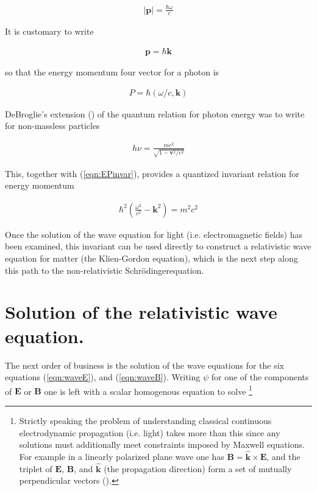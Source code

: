 \documentclass[]{eliblog}
\newcommand{\Abs}[1]{{\left\lvert{#1}\right\rvert}}
\newcommand{\BB}[0]{\mathbf{B}}
\newcommand{\BE}[0]{\mathbf{E}}
\newcommand{\Bk}[0]{\mathbf{k}}
\newcommand{\Bp}[0]{\mathbf{p}}
\newcommand{\Bv}[0]{\mathbf{v}}
\newcommand{\cross}[0]{\times}
\newcommand{\kcap}[0]{\hat{\Bk}}
\newcommand{\Schrodinger}[0]{Schr\"{o}dinger}
\begin{document}
\begin{align}
\Abs{\Bp} = \frac{\hbar \omega}{c}
\end{align}

It is customary to write

\begin{align}
{\Bp} = \hbar \Bk
\end{align}

so that the energy momentum four vector for a photon is

\begin{align}
P = \hbar ( \omega/c, \Bk )
\end{align}

DeBroglie's extension (\cite{AFkracklauerDeBroglie}) of the quantum relation for photon energy was to write for non-massless particles

\begin{align}
h \nu = \frac{m c^2}{\sqrt{1 - \Bv^2/c^2}}
\end{align}

This, together with (\ref{eqn:EPinvar}), provides a quantized invariant relation for energy momentum

\begin{align}\label{eqn:DeBroglie}
\hbar^2 \left( \frac{\omega^2}{c^2} - \Bk^2 \right) = m^2 c^2
\end{align}

Once the solution of the wave equation for light (i.e. electromagnetic fields) has been examined, this invariant can be
used directly to construct a relativistic wave equation for matter (the Klien-Gordon equation), which is the next step along this 
path to the non-relativistic \Schrodinger equation.

\section{Solution of the relativistic wave equation.}

The next order of business is the solution of the wave equations for the six 
equations (\ref{eqn:waveE}), and (\ref{eqn:waveB}).  
Writing $\psi$ for one of the components of $\BE$ or $\BB$ one is left with a scalar homogenous equation to solve
\footnote{Strictly speaking the problem of understanding classical continuous electrodynamic propagation (i.e. light) takes more than this since any solutions must additionally meet constraints imposed by Maxwell equations.  For example in a linearly polarized plane wave one has $\BB = \kcap \cross \BE$, and the triplet of $\BE$, $\BB$, and $\kcap$ (the propagation direction) form a set of mutually perpendicular vectors (\cite{jackson1975cewWave}).}
\end{document}

